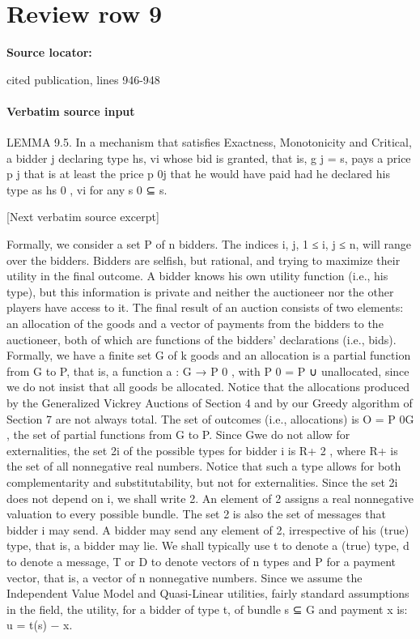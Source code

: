 \documentclass[10pt]{article}
\begin{document}
\section*{Review row 9}
\textbf{Source locator:} {\footnotesize\raggedright cited publication, lines 946-\allowbreak{}948\par}
\paragraph{Verbatim source input}
\begin{ReviewVerbatim}
LEMMA 9.5. In a mechanism that satisfies Exactness, Monotonicity and Critical, a bidder j declaring type hs, vi whose bid is granted, that is, g j = s, pays a
price p j that is at least the price p 0j that he would have paid had he declared his
type as hs 0 , vi for any s 0 ⊆ s.

[Next verbatim source excerpt]

Formally, we consider a set P of n bidders. The indices i, j, 1 ≤ i, j ≤ n, will
range over the bidders. Bidders are selfish, but rational, and trying to maximize their
utility in the final outcome. A bidder knows his own utility function (i.e., his type),
but this information is private and neither the auctioneer nor the other players have
access to it. The final result of an auction consists of two elements: an allocation
of the goods and a vector of payments from the bidders to the auctioneer, both of
which are functions of the bidders’ declarations (i.e., bids). Formally, we have a
finite set G of k goods and an allocation is a partial function from G to P, that is, a
function a : G → P 0 , with P 0 = P ∪ {unallocated}, since we do not insist that all
goods be allocated. Notice that the allocations produced by the Generalized Vickrey
Auctions of Section 4 and by our Greedy algorithm of Section 7 are not always
total. The set of outcomes (i.e., allocations) is O = P 0G , the set of partial functions
from G to P. Since Gwe do not allow for externalities, the set 2i of the possible types
for bidder i is R+ 2 , where R+ is the set of all nonnegative real numbers. Notice
that such a type allows for both complementarity and substitutability, but not for
externalities. Since the set 2i does not depend on i, we shall write 2. An element
of 2 assigns a real nonnegative valuation to every possible bundle. The set 2 is
also the set of messages that bidder i may send. A bidder may send any element of
2, irrespective of his (true) type, that is, a bidder may lie. We shall typically use t
to denote a (true) type, d to denote a message, T or D to denote vectors of n types
and P for a payment vector, that is, a vector of n nonnegative numbers.
Since we assume the Independent Value Model and Quasi-Linear utilities, fairly
standard assumptions in the field, the utility, for a bidder of type t, of bundle s ⊆ G
and payment x is:
u = t(s) − x.


\end{ReviewVerbatim}
\end{document}
